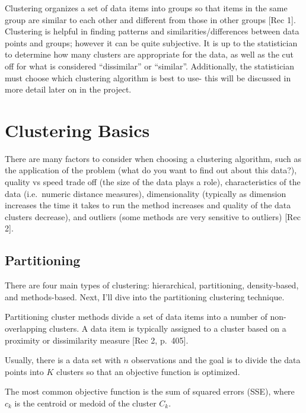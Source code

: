 \documentclass[12pt,twoside]{amherstthesis}
\begin{document}
  Clustering organizes a set of data items into groups so that items in
  the same group are similar to each other and different from those in
  other groups {[}Rec 1{]}. Clustering is helpful in finding patterns and
  similarities/differences between data points and groups; however it can
  be quite subjective. It is up to the statistician to determine how many
  clusters are appropriate for the data, as well as the cut off for what
  is considered ``dissimilar'' or ``similar''. Additionally, the
  statistician must choose which clustering algorithm is best to use- this
  will be discussed in more detail later on in the project.
  
  \chapter{Clustering Basics}\label{rmd-basics}
  
  There are many factors to consider when choosing a clustering algorithm,
  such as the application of the problem (what do you want to find out
  about this data?), quality vs speed trade off (the size of the data
  plays a role), characteristics of the data (i.e.~numeric distance
  measures), dimensionality (typically as dimension increases the time it
  takes to run the method increases and quality of the data clusters
  decrease), and outliers (some methods are very sensitive to outliers)
  {[}Rec 2{]}.
  
  \section{Partitioning}\label{partitioning}
  
  There are four main types of clustering: hierarchical, partitioning,
  density-based, and methods-based. Next, I'll dive into the partitioning
  clustering technique.
  
  Partitioning cluster methods divide a set of data items into a number of
  non-overlapping clusters. A data item is typically assigned to a cluster
  based on a proximity or dissimilarity measure {[}Rec 2, p.~405{]}.
  
  Usually, there is a data set with \(n\) observations and the goal is to
  divide the data points into \(K\) clusters so that an objective function
  is optimized.
  
  The most common objective function is the sum of squared errors (SSE),
  where \(c_k\) is the centroid or medoid of the cluster \(C_k\).
  
\end{document}
